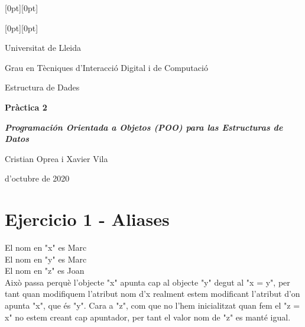 \documentclass[a4paper, 12pt]{article}
\begin{document}
\begin{titlepage}

\raisebox{-0.2em}[0pt][0pt]{%
}

\raisebox{1.9em}[0pt][0pt]{%
}

    \centering
    {\Large
    Universitat de Lleida\par
    Grau en Tècniques d'Interacció Digital i de Computació\par
    Estructura de Dades\par
}
    \vfill
    {\Huge\bfseries Pràctica 2\par}\vspace{3ex}
    {\Large\bfseries \textit{Programación Orientada a Objetos (POO) para las Estructuras de Datos}\par}
\vspace{6ex}
{\Large
Cristian Oprea i Xavier Vila
\par}
\vfill
\parbox{.5\textwidth}{ d'octubre de 2020}
\end{titlepage}

\section*{Ejercicio 1 - Aliases}
El nom en "x" es Marc\\
El nom en "y" es Marc\\
El nom en "z" es Joan\\
Això passa perquè l'objecte "x" apunta cap al objecte "y" degut al "x = y", per tant quan modifiquem l'atribut nom d'x realment estem modificant l'atribut d'on apunta "x", que és "y".
Cara a "z", com que no l'hem inicialitzat quan fem el "z = x" no estem creant cap apuntador, per tant el valor nom de "z" es manté igual.
\end{document}
